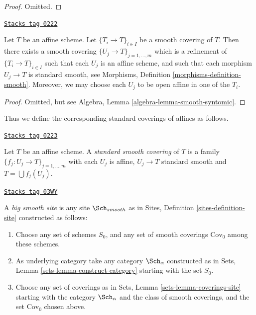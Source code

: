 \begin{proof}
Omitted.
\end{proof}

\begin{lemma}
\label{topologies-lemma-smooth-affine}
\href{https://stacks.math.columbia.edu/tag/0222}{\texttt{Stacks tag 0222}}

Let $T$ be an affine scheme.
Let $\{T_i \to T\}_{i \in I}$ be a smooth covering of $T$.
Then there exists a smooth covering
$\{U_j \to T\}_{j = 1, \ldots, m}$ which is a refinement
of $\{T_i \to T\}_{i \in I}$ such that each $U_j$ is an affine
scheme, and such that each morphism $U_j \to T$ is standard
smooth, see Morphisms, Definition \ref{morphisms-definition-smooth}.
Moreover, we may choose each $U_j$ to be open affine in one of the $T_i$.
\end{lemma}

\begin{proof}
Omitted, but see Algebra, Lemma \ref{algebra-lemma-smooth-syntomic}.
\end{proof}

Thus we define the corresponding standard coverings of affines as follows.

\begin{definition}
\label{topologies-definition-standard-smooth}
\href{https://stacks.math.columbia.edu/tag/0223}{\texttt{Stacks tag 0223}}

Let $T$ be an affine scheme. A {\it standard smooth covering}
of $T$ is a family $\{f_j : U_j \to T\}_{j = 1, \ldots, m}$
with each $U_j$ is affine, $U_j \to T$ standard smooth
and $T = \bigcup f_j(U_j)$.
\end{definition}

\begin{definition}
\label{topologies-definition-big-smooth-site}
\href{https://stacks.math.columbia.edu/tag/03WY}{\texttt{Stacks tag 03WY}}

A {\it big smooth site} is any site $\Sch_{smooth}$ as in
Sites, Definition \ref{sites-definition-site} constructed as follows:
\begin{enumerate}
\item Choose any set of schemes $S_0$, and any set of smooth coverings
$\text{Cov}_0$ among these schemes.
\item As underlying category take any category $\Sch_\alpha$
constructed as in Sets, Lemma \ref{sets-lemma-construct-category}
starting with the set $S_0$.
\item Choose any set of coverings as in
Sets, Lemma \ref{sets-lemma-coverings-site} starting with the
category $\Sch_\alpha$ and the class of smooth coverings,
and the set $\text{Cov}_0$ chosen above.
\end{enumerate}
\end{definition}

